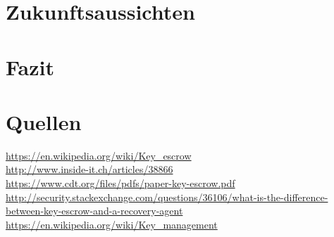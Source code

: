 \documentclass[a4paper, 10pt, fleqn]{article}
\begin{document}
\section{Zukunftsaussichten}
\clearpage
\section{Fazit}
\clearpage
\section*{Quellen}
\url{https://en.wikipedia.org/wiki/Key_escrow}\\
\url{http://www.inside-it.ch/articles/38866}\\
\url{https://www.cdt.org/files/pdfs/paper-key-escrow.pdf}\\
\url{http://security.stackexchange.com/questions/36106/what-is-the-difference-between-key-escrow-and-a-recovery-agent}\\
\url{https://en.wikipedia.org/wiki/Key_management}
\end{document}
